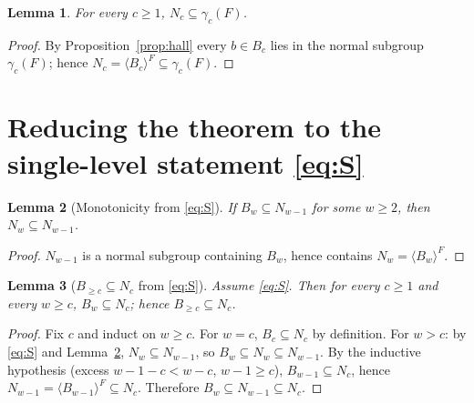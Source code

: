 \documentclass{amsart}
\newtheorem{lemma}{Lemma}
\theoremstyle{definition}
\theoremstyle{remark}
\begin{document}
\begin{lemma}\label{lem:easy}
For every $c\ge1$, $N_c\subseteq\gamma_c(F)$.
\end{lemma}
\begin{proof}
By Proposition~\ref{prop:hall} every $b\in B_c$ lies in the normal subgroup
$\gamma_c(F)$; hence $N_c=\langle B_c\rangle^{F}\subseteq\gamma_c(F)$.
\end{proof}

\section{Reducing the theorem to the single-level statement \eqref{eq:S}}
\label{sec:chain}

\begin{lemma}[Monotonicity from \eqref{eq:S}]\label{lem:mono}
If $B_w\subseteq N_{w-1}$ for some $w\ge2$, then $N_w\subseteq N_{w-1}$.
\end{lemma}
\begin{proof}
$N_{w-1}$ is a normal subgroup containing $B_w$, hence contains $N_w=\langle
B_w\rangle^{F}$.
\end{proof}

\begin{lemma}[$B_{\ge c}\subseteq N_c$ from \eqref{eq:S}]\label{lem:Bgec}
Assume \eqref{eq:S}. Then for every $c\ge1$ and every $w\ge c$, $B_w\subseteq N_c$;
hence $B_{\ge c}\subseteq N_c$.
\end{lemma}
\begin{proof}
Fix $c$ and induct on $w\ge c$. For $w=c$, $B_c\subseteq N_c$ by definition. For
$w>c$: by \eqref{eq:S} and Lemma~\ref{lem:mono}, $N_w\subseteq N_{w-1}$, so
$B_w\subseteq N_w\subseteq N_{w-1}$. By the inductive hypothesis (excess
$w-1-c<w-c$, $w-1\ge c$), $B_{w-1}\subseteq N_c$, hence
$N_{w-1}=\langle B_{w-1}\rangle^{F}\subseteq N_c$. Therefore $B_w\subseteq
N_{w-1}\subseteq N_c$.
\end{proof}
\end{document}
